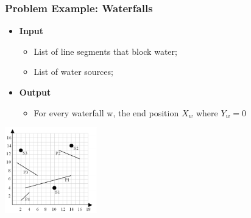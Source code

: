 \begin{frame}
  \frametitle{Problem Example: Waterfalls}
    \begin{block}{}
      \begin{itemize}
      \item {\bf Input}
      \begin{itemize}
        \item List of line segments that block water;
        \item List of water sources;
      \end{itemize}

      \item {\bf Output}
      \begin{itemize}
        \item For every waterfall w, the end position $X_w$ where $Y_w=0$
      \end{itemize}
      \end{itemize}
    \end{block}

    \includegraphics[width=0.30\textwidth]{img/waterfall}
\end{frame}


